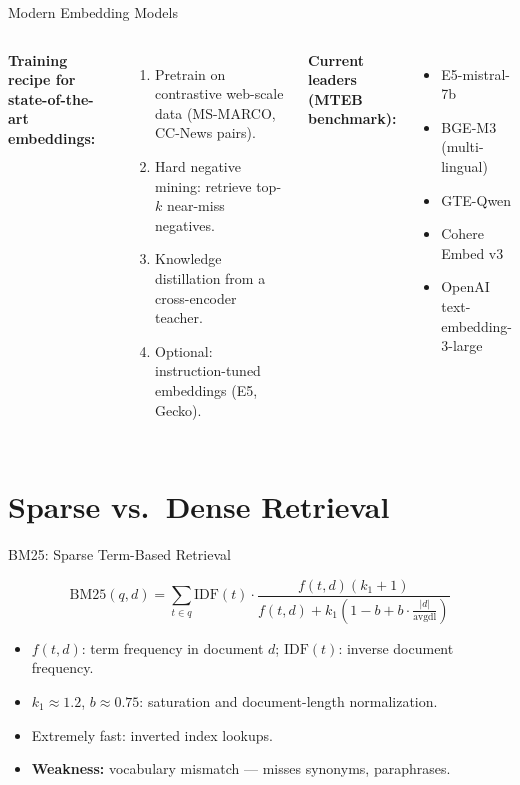 \documentclass[aspectratio=169,10pt]{beamer}
\begin{document}
\begin{frame}{Modern Embedding Models}
  \begin{columns}[T]
      \textbf{Training recipe for state-of-the-art embeddings:}
      \begin{enumerate}
        \item Pretrain on contrastive web-scale data (MS-MARCO, CC-News pairs).
        \item Hard negative mining: retrieve top-$k$ near-miss negatives.
        \item Knowledge distillation from a cross-encoder teacher.
        \item Optional: instruction-tuned embeddings (E5, Gecko).
      \end{enumerate}
      \textbf{Current leaders (MTEB benchmark):}
      \begin{itemize}
        \item E5-mistral-7b
        \item BGE-M3 (multi-lingual)
        \item GTE-Qwen
        \item Cohere Embed v3
        \item OpenAI text-embedding-3-large
      \end{itemize}
  \end{columns}
\end{frame}

\section{Sparse vs.\ Dense Retrieval}

\begin{frame}{BM25: Sparse Term-Based Retrieval}
  \begin{tcolorbox}[hitbox, title=BM25 Score]
    \[
      \text{BM25}(q, d) = \sum_{t \in q} \mathrm{IDF}(t)
      \cdot \frac{f(t,d)(k_1+1)}{f(t,d) + k_1\left(1 - b + b\cdot\frac{|d|}{\text{avgdl}}\right)}
    \]
  \end{tcolorbox}
  \vspace{0.3em}
  \begin{itemize}
    \item $f(t,d)$: term frequency in document $d$; $\mathrm{IDF}(t)$: inverse document frequency.
    \item $k_1 \approx 1.2$, $b \approx 0.75$: saturation and document-length normalization.
    \item Extremely fast: inverted index lookups.
    \item \textbf{Weakness:} vocabulary mismatch — misses synonyms, paraphrases.
  \end{itemize}
\end{frame}
\end{document}
